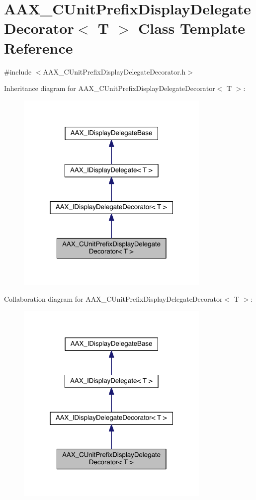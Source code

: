 \hypertarget{a00046}{}\section{A\+A\+X\+\_\+\+C\+Unit\+Prefix\+Display\+Delegate\+Decorator$<$ T $>$ Class Template Reference}
\label{a00046}


{\ttfamily \#include $<$A\+A\+X\+\_\+\+C\+Unit\+Prefix\+Display\+Delegate\+Decorator.\+h$>$}



Inheritance diagram for A\+A\+X\+\_\+\+C\+Unit\+Prefix\+Display\+Delegate\+Decorator$<$ T $>$\+:
\nopagebreak
\begin{figure}[H]
\begin{center}
\leavevmode
\includegraphics[width=265pt]{a00483}
\end{center}
\end{figure}


Collaboration diagram for A\+A\+X\+\_\+\+C\+Unit\+Prefix\+Display\+Delegate\+Decorator$<$ T $>$\+:
\nopagebreak
\begin{figure}[H]
\begin{center}
\leavevmode
\includegraphics[width=265pt]{a00484}
\end{center}
\end{figure}


